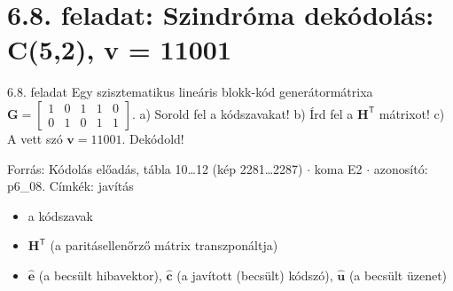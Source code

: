 \begin{tipp}

\par{}\par
\end{tipp}


\section{\texorpdfstring{6.8. feladat: Szindróma dekódolás: C(5,2), v = 11001}{6.8. feladat: Szindróma dekódolás: C(5,2), v = 11001}}\label{p6_08}
\setcounter{lepes}{0}
\begin{feladat}{6.8. feladat}
Egy szisztematikus lineáris blokk-kód generátormátrixa $\mathbf G=\begin{bmatrix}1&0&1&1&0\\0&1&0&1&1\end{bmatrix}$. a) Sorold fel a kódszavakat! b) Írd fel a $\mathbf H^{\mathsf T}$ mátrixot! c) A vett szó $\mathbf v=11001$. Dekódold!

{\footnotesize\sffamily Forrás: Kódolás előadás, tábla 10\ldots{}12 (kép 2281\ldots{}2287) $\cdot$ koma E2 $\cdot$ azonosító: p6\_08. Címkék: javítás}
\end{feladat}
\begin{keresunk}
\begin{itemize}
\item a kódszavak
\item $\mathbf H^{\mathsf T}$ (a paritásellenőrző mátrix transzponáltja)
\item $\hat{\mathbf e}$ (a becsült hibavektor), $\hat{\mathbf c}$ (a javított (becsült) kódszó), $\hat{\mathbf u}$ (a becsült üzenet)
\end{itemize}
\end{keresunk}
